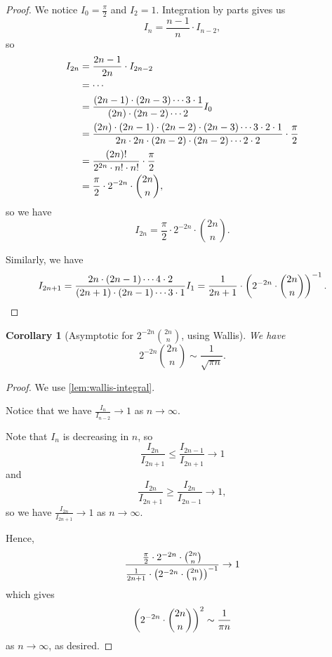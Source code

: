 \documentclass{article}
\newtheorem{corollary}[theorem]{Corollary}
\theoremstyle{definition}
\theoremstyle{remark}
\newcommand{\inverse}{^{-1}}
\begin{document}
\begin{proof}
    We notice \(I_0 = \frac{\pi}{2}\) and \(I_2 = 1\). Integration by parts gives us
    \[
        I_n = \frac{n - 1}{n} \cdot I_{n - 2},
    \]
    so
    \begin{align*}
        I_{2n} &= \frac{2n - 1}{2n} \cdot I_{2n - 2} \\
        &= \cdots \\
        &= \frac{\left(2n - 1\right) \cdot \left(2n - 3\right) \cdots 3 \cdot 1}{\left(2n\right) \cdot \left(2n - 2\right) \cdots 2} I_0 \\
        &= \frac{\left(2n\right) \cdot \left(2n - 1\right) \cdot \left(2n - 2\right) \cdot \left(2n - 3\right) \cdots 3 \cdot 2 \cdot 1}{2n \cdot 2n \cdot \left(2n - 2\right) \cdot \left(2n - 2\right) \cdots 2 \cdot 2} \cdot \frac{\pi}{2} \\
        &= \frac{\left(2n\right)!}{2^{2n} \cdot n! \cdot n!} \cdot \frac{\pi}{2} \\
        &= \frac{\pi}{2} \cdot 2^{-2n} \cdot \binom{2n}{n},
    \end{align*}
    so we have
    \[
        I_{2n} = \frac{\pi}{2} \cdot 2^{-2n} \cdot \binom{2n}{n}.
    \]

    Similarly, we have
    \[
        I_{2n + 1} = \frac{2n \cdot \pqty{2n - 1} \cdots 4 \cdot 2}{\pqty{2n + 1} \cdot \pqty{2n - 1} \cdots 3 \cdot 1} I_1 = \frac{1}{2n + 1} \cdot \pqty{2^{-2n} \cdot \binom{2n}{n}}\inverse.
    \]

\end{proof}

\begin{corollary}[Asymptotic for \(2^{-2n} \binom{2n}{n}\), using Wallis]
    \label{cor:asymptotic-binomial-wallis}%
    We have
    \[
        2^{-2n} \binom{2n}{n} \sim \frac{1}{\sqrt{\pi n}}.
    \]
\end{corollary}

\begin{proof}
    We use \autoref{lem:wallis-integral}. 

    Notice that we have \(\frac{I_n}{I_{n - 2}} \to 1\) as \(n \to \infty\).

    Note that \(I_n\) is decreasing in \(n\), so
    \[
        \frac{I_{2n}}{I_{2n + 1}} \leq \frac{I_{2n - 1}}{I_{2n + 1}} \to 1
    \]
    and
    \[
        \frac{I_{2n}}{I_{2n + 1}} \geq \frac{I_{2n}}{I_{2n - 1}} \to 1,
    \]
    so we have \(\frac{I_{2n}}{I_{2n + 1}} \to 1\) as \(n \to \infty\).

    Hence,
    \[
        \frac{\frac{\pi}{2} \cdot 2^{-2n} \cdot \binom{2n}{n}}{\frac{1}{2n + 1} \cdot \pqty{2^{-2n} \cdot \binom{2n}{n}}\inverse} \to 1
    \]
    which gives
    \[
        \left(2^{-2n} \cdot \binom{2n}{n}\right)^2 \sim \frac{1}{\pi n}
    \]
    as \(n \to \infty\), as desired.
\end{proof}
\end{document}

